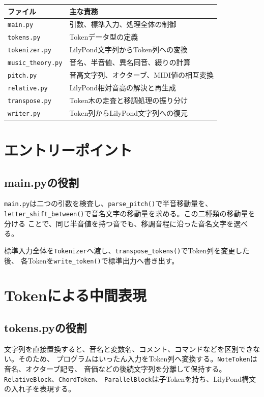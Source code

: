 \documentclass[uplatex,a4paper,11pt]{jsbook}
\begin{document}
\begin{longtable}{@{}p{36mm}p{105mm}@{}}
\toprule
ファイル & 主な責務\\
\midrule
\texttt{main.py} & 引数、標準入力、処理全体の制御\\
\texttt{tokens.py} & Tokenデータ型の定義\\
\texttt{tokenizer.py} & LilyPond文字列からToken列への変換\\
\texttt{music\_theory.py} & 音名、半音値、異名同音、綴りの計算\\
\texttt{pitch.py} & 音高文字列、オクターブ、MIDI値の相互変換\\
\texttt{relative.py} & LilyPond相対音高の解決と再生成\\
\texttt{transpose.py} & Token木の走査と移調処理の振り分け\\
\texttt{writer.py} & Token列からLilyPond文字列への復元\\
\bottomrule
\end{longtable}

\chapter{エントリーポイント}

\section{main.pyの役割}

\texttt{main.py}は二つの引数を検査し、\texttt{parse\_pitch()}で半音移動量を、
\texttt{letter\_shift\_between()}で音名文字の移動量を求める。この二種類の移動量を分ける
ことで、同じ半音値を持つ音でも、移調音程に沿った音名文字を選べる。

標準入力全体を\texttt{Tokenizer}へ渡し、\texttt{transpose\_tokens()}でToken列を変更した後、
各Tokenを\texttt{write\_token()}で標準出力へ書き出す。



\chapter{Tokenによる中間表現}

\section{tokens.pyの役割}

文字列を直接置換すると、音名と変数名、コメント、コマンドなどを区別できない。そのため、
プログラムはいったん入力をToken列へ変換する。\texttt{NoteToken}は音名、オクターブ記号、
音価などの後続文字列を分離して保持する。\texttt{RelativeBlock}、\texttt{ChordToken}、
\texttt{ParallelBlock}は子Tokenを持ち、LilyPond構文の入れ子を表現する。
\end{document}
